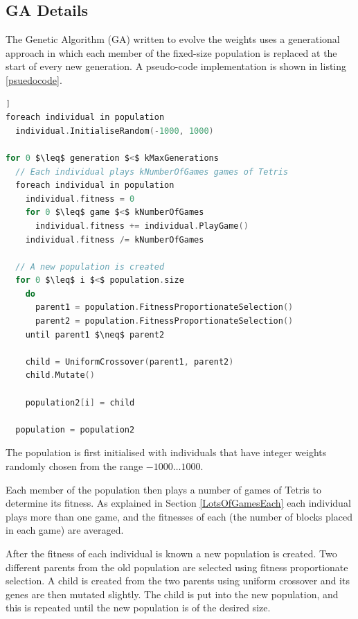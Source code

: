 \documentclass[a4paper,12pt]{article}
\begin{document}
\subsection{GA Details}

The Genetic Algorithm (GA) written to evolve the weights uses a generational
approach in which each member of the fixed-size population is replaced at the
start of every new generation.
A pseudo-code implementation is shown in listing \ref{psuedocode}.

\begin{lstlisting}[firstnumber=1,language=c,morekeywords={until,foreach,in},frame=single,mathescape=true,caption={GA pseudo-code},label={psuedocode},float=[htb]]
foreach individual in population
  individual.InitialiseRandom(-1000, 1000)

for 0 $\leq$ generation $<$ kMaxGenerations
  // Each individual plays kNumberOfGames games of Tetris
  foreach individual in population
    individual.fitness = 0
    for 0 $\leq$ game $<$ kNumberOfGames
      individual.fitness += individual.PlayGame()
    individual.fitness /= kNumberOfGames
  
  // A new population is created
  for 0 $\leq$ i $<$ population.size
    do
      parent1 = population.FitnessProportionateSelection()
      parent2 = population.FitnessProportionateSelection()
    until parent1 $\neq$ parent2
    
    child = UniformCrossover(parent1, parent2)
    child.Mutate()
    
    population2[i] = child
    
  population = population2
\end{lstlisting}

The population is first initialised with individuals that have integer weights
randomly chosen from the range $-1000 \ldots 1000$.

Each member of the population then plays a number of games of Tetris to
determine its fitness.
As explained in Section \ref{LotsOfGamesEach} each individual plays more than
one game, and the fitnesses of each (the number of blocks placed in each game)
are averaged.

After the fitness of each individual is known a new population is created.
Two different parents from the old population are selected using fitness
proportionate selection.
A child is created from the two parents using uniform crossover and its genes
are then mutated slightly.
The child is put into the new population, and this is repeated until the new
population is of the desired size.
\end{document}
